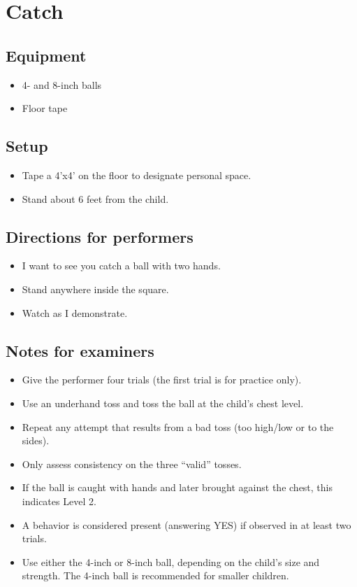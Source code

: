 \documentclass[
  letterpaper,
  DIV=11,
  numbers=noendperiod]{scrreprt}
\providecommand{\tightlist}{%
  \setlength{\itemsep}{0pt}\setlength{\parskip}{0pt}}
\begin{document}
\section{Catch}\label{catch}

\subsection{Equipment}\label{equipment-4}

\begin{itemize}
\tightlist
\item
  4- and 8-inch balls
\item
  Floor tape
\end{itemize}

\subsection{Setup}\label{setup-3}

\begin{itemize}
\tightlist
\item
  Tape a 4'x4' on the floor to designate personal space.
\item
  Stand about 6 feet from the child.
\end{itemize}

\subsection{Directions for
performers}\label{directions-for-performers-3}

\begin{itemize}
\tightlist
\item
  I want to see you catch a ball with two hands.
\item
  Stand anywhere inside the square.
\item
  Watch as I demonstrate.
\end{itemize}

\subsection{Notes for examiners}\label{notes-for-examiners-3}

\begin{itemize}
\tightlist
\item
  Give the performer four trials (the first trial is for practice only).
\item
  Use an underhand toss and toss the ball at the child's chest level.
\item
  Repeat any attempt that results from a bad toss (too high/low or to
  the sides).
\item
  Only assess consistency on the three ``valid'' tosses.
\item
  If the ball is caught with hands and later brought against the chest,
  this indicates Level 2.
\item
  A behavior is considered present (answering YES) if observed in at
  least two trials.
\item
  Use either the 4-inch or 8-inch ball, depending on the child's size
  and strength. The 4-inch ball is recommended for smaller children.
\end{itemize}
\end{document}

